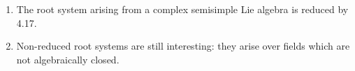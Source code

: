 \begin{enumerate}
	\item The root system arising from a complex semisimple Lie algebra is reduced
by 4.17.
	\item Non-reduced root systems are still interesting: they arise over fields
		which are not algebraically closed.
\end{enumerate}
